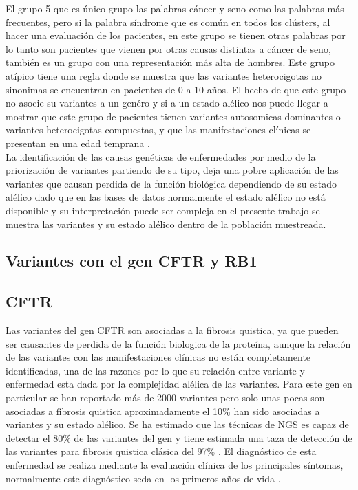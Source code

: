 El grupo 5 que es único grupo las palabras cáncer y seno como las palabras más frecuentes, pero si la palabra síndrome que es común en todos los clústers, al hacer una evaluación de los pacientes, en este grupo se tienen otras palabras por lo tanto son pacientes que vienen por otras causas distintas a cáncer de seno, también es un grupo con una representación más alta de hombres. Este grupo atípico tiene una regla donde se muestra que las variantes heterocigotas no sinonimas se encuentran  en pacientes de 0 a 10 años. El hecho de que este grupo no asocie su variantes a un genéro y si a un estado alélico nos puede llegar a mostrar que este grupo de pacientes tienen variantes autosomicas dominantes o variantes heterocigotas compuestas, y que las manifestaciones clínicas se presentan en una edad temprana \cite{Kamphans2013}. \\

La identificación de las causas genéticas de enfermedades por medio de la priorización de variantes partiendo de su tipo, deja una pobre aplicación de las variantes que causan perdida de la función biológica dependiendo de su estado alélico \cite{Eilbeck2017} dado que en las bases de datos normalmente el estado alélico no está disponible y su interpretación puede ser compleja \cite{Stenson2017} en el presente trabajo se muestra las variantes y su estado alélico dentro de la población muestreada. 


\subsection{Variantes con el gen CFTR y RB1}

\subsection*{CFTR}

Las variantes del gen CFTR son asociadas a la fibrosis quistica, ya que pueden ser causantes de perdida de la función biologica de la proteína, aunque la relación de las variantes con las manifestaciones clínicas no están completamente identificadas, una de las razones por lo que su relación entre variante y enfermedad esta dada por la complejidad alélica de las variantes. Para este gen en particular se han reportado más de 2000 variantes pero solo unas pocas son asociadas a fibrosis quistica aproximadamente el 10\% han sido asociadas a variantes y su estado alélico. Se ha estimado que las técnicas de NGS es capaz de detectar el 80\% de las variantes del gen y tiene estimada una taza de detección de las variantes para fibrosis quistica clásica del 97\% \cite{Rowntree2003, Terlizzi2017b, Farrell2016}. El diagnóstico de esta enfermedad se realiza mediante la evaluación clínica de los principales síntomas, normalmente este diagnóstico seda en los primeros años de vida \cite{Terlizzi2017b}. \\

